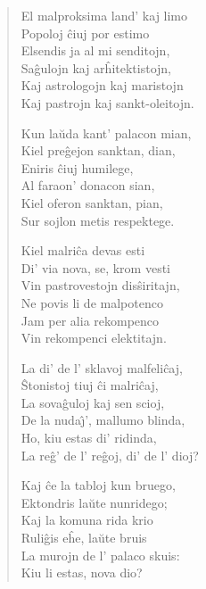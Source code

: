 \begin{verse}
                     El malproksima land' kaj limo\\
                     Popoloj \^ciuj por estimo\\
                     Elsendis ja al mi senditojn,\\
                     Sa\^gulojn kaj ar\^hitektistojn,\\
                     Kaj astrologojn kaj maristojn\\
                     Kaj pastrojn kaj sankt-oleitojn.

                     Kun la\u uda kant' palacon mian,\\
                     Kiel pre\^gejon sanktan, dian,\\
                     Eniris \^ciuj humilege,\\
                     Al faraon' donacon sian,\\
                     Kiel oferon sanktan, pian,\\
                     Sur sojlon metis respektege.

                     Kiel malri\^ca devas esti\\
                     Di' via nova, se, krom vesti\\
                     Vin pastrovestojn dis\^siritajn,\\
                     Ne povis li de malpotenco\\
                     Jam per alia rekompenco\\
                     Vin rekompenci elektitajn.

                     La di' de l' sklavoj malfeli\^caj,\\
                     \^Stonistoj tiuj \^ci malri\^caj,\\
                     La sova\^guloj kaj sen scioj,\\
                     De la nuda\^{\j}', mallumo blinda,\\
                     Ho, kiu estas di' ridinda,\\
                     La re\^g' de l' re\^goj, di' de l' dioj?

                     Kaj \^ce la tabloj kun bruego,\\
                     Ektondris la\u ute nunridego;\\
                     Kaj la komuna rida krio\\
                     Ruli\^gis e\^he, la\u ute bruis\\
                     La murojn de l' palaco skuis:\\
                     Kiu li estas, nova dio?


\end{verse}
